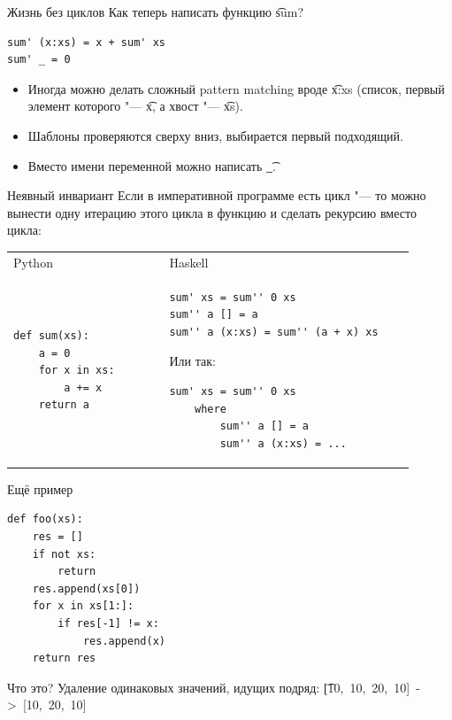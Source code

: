 \begin{frame}[t,fragile]{Жизнь без циклов}
	Как теперь написать функцию \t{sum}?
\begin{verbatim}
sum' (x:xs) = x + sum' xs
sum' _ = 0
\end{verbatim}
	\begin{itemize}
		\item Иногда можно делать сложный pattern matching вроде \t{x:xs} (список, первый элемент которого "--- \t{x}, а хвост "--- \t{xs}).
		\item Шаблоны проверяются сверху вниз, выбирается первый подходящий.
		\item Вместо имени переменной можно написать \t{\_}.
	\end{itemize}
\end{frame}

\begin{frame}[fragile]{Неявный инвариант}
	Если в императивной программе есть цикл "--- то можно вынести одну итерацию этого цикла в функцию и сделать рекурсию вместо цикла:

	\begin{tabular}{p{0.35\linewidth}p{0.55\linewidth}}
		\centering
		Python & Haskell \\
\begin{verbatim}
def sum(xs):
    a = 0
    for x in xs:
        a += x
    return a
\end{verbatim}
		&
\begin{verbatim}
sum' xs = sum'' 0 xs
sum'' a [] = a
sum'' a (x:xs) = sum'' (a + x) xs
\end{verbatim}
\pause
Или так:
\begin{verbatim}
sum' xs = sum'' 0 xs
    where
        sum'' a [] = a
        sum'' a (x:xs) = ...
\end{verbatim}
	\end{tabular}
\end{frame}

\begin{frame}[t, fragile]{Ещё пример}
\begin{verbatim}
def foo(xs):
    res = []
    if not xs:
        return
    res.append(xs[0])
    for x in xs[1:]:
        if res[-1] != x:
            res.append(x)
    return res
\end{verbatim}
	Что это?
	\pause
	Удаление одинаковых значений, идущих подряд: \t{[10,~10,~20,~10]~->~[10,~20,~10]}
\end{frame}

